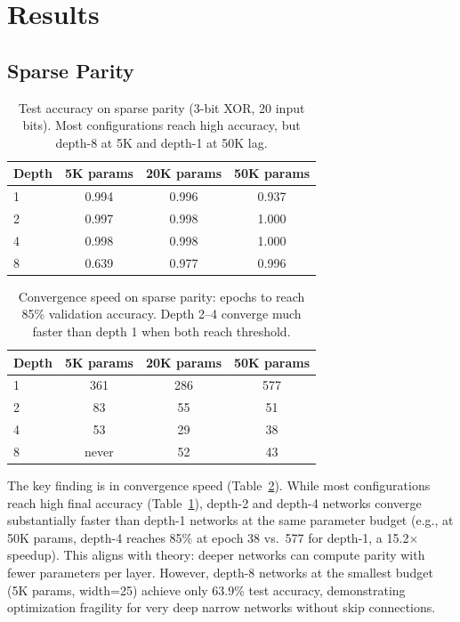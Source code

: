 \documentclass[11pt,a4paper]{article}
\begin{document}
\section{Results}

\subsection{Sparse Parity}

\begin{table}[h]
\centering
\caption{Test accuracy on sparse parity (3-bit XOR, 20 input bits). Most configurations reach high accuracy, but depth-8 at 5K and depth-1 at 50K lag.}
\label{tab:parity-acc}
\begin{tabular}{@{}lccc@{}}
\toprule
Depth & 5K params & 20K params & 50K params \\
\midrule
1 & 0.994 & 0.996 & 0.937 \\
2 & 0.997 & 0.998 & 1.000 \\
4 & 0.998 & 0.998 & 1.000 \\
8 & 0.639 & 0.977 & 0.996 \\
\bottomrule
\end{tabular}
\end{table}

\begin{table}[h]
\centering
\caption{Convergence speed on sparse parity: epochs to reach 85\% validation accuracy. Depth 2--4 converge much faster than depth 1 when both reach threshold.}
\label{tab:parity-speed}
\begin{tabular}{@{}lccc@{}}
\toprule
Depth & 5K params & 20K params & 50K params \\
\midrule
1 & 361 & 286 & 577 \\
2 & 83 & 55 & 51 \\
4 & 53 & 29 & 38 \\
8 & never & 52 & 43 \\
\bottomrule
\end{tabular}
\end{table}

The key finding is in convergence speed (Table~\ref{tab:parity-speed}). While most configurations reach high final accuracy (Table~\ref{tab:parity-acc}), depth-2 and depth-4 networks converge substantially faster than depth-1 networks at the same parameter budget (e.g., at 50K params, depth-4 reaches 85\% at epoch 38 vs.\ 577 for depth-1, a 15.2$\times$ speedup). This aligns with theory: deeper networks can compute parity with fewer parameters per layer. However, depth-8 networks at the smallest budget (5K params, width=25) achieve only 63.9\% test accuracy, demonstrating optimization fragility for very deep narrow networks without skip connections.
\end{document}
